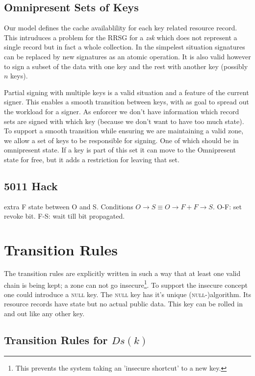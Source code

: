 \documentclass[twoside,english, a4paper]{article}
\begin{document}
\subsection{Omnipresent Sets of Keys}
\label{redifined-propagated}

Our model defines the cache availablility for each key related resource
record. This intruduces a problem for the RRSG for a \emph{zsk} which
does not represent a single record but in fact a whole collection. 
In the simpelest situation signatures can be replaced by new signatures 
as an atomic operation. It is also valid however to sign a subset of
the data with one key and the rest with another key (possibly $n$ keys).

Partial signing with multiple keys is a valid situation and a 
feature of the current signer. This enables a smooth transition 
between keys, with as goal to spread out the workload for a signer. 
As enforcer we don't have information which record sets are signed 
with which key (because we don't want to have too much state). To 
support a smooth transition while ensuring we are maintaining a 
valid zone, we allow a set of keys to be 
responsible for signing. One of which should be in omnipresent state.
If a key is part of this set it can move to the Omnipresent state for 
free, but it adds a restriction for leaving that set.

\subsection{5011 Hack}

extra F state between O and S. Conditions $O\rightarrow S \equiv O\rightarrow F + F\rightarrow S$.
O-F: set revoke bit. F-S: wait till bit propagated. 

\section{Transition Rules}

The transition rules are explicitly written in such a way that at 
least one valid chain is being kept; a zone can not go insecure\footnote{
This prevents the system taking an 'insecure shortcut' to a new key.}. To support the insecure concept one could introduce a 
\textsc{null} key. The \textsc{null} key has it's unique (\textsc 
{null}-)algorithm. Its resource records have state but no actual 
public data. This key can be rolled in and out like any other key.

\subsection{Transition Rules for $Ds(k)$}
\end{document}
